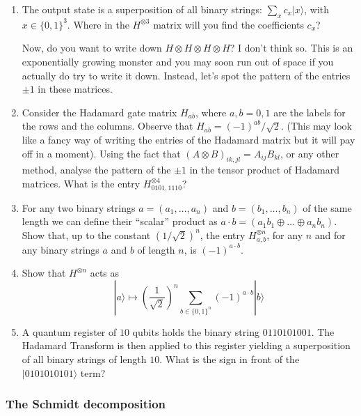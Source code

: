 \documentclass[fleqn]{article}
\begin{document}
\begin{enumerate}
\def\labelenumi{\arabic{enumi}.}
\setcounter{enumi}{2}
\item
  The output state is a superposition of all binary strings: \(\sum_x c_x|x\rangle\), with \(x\in\{0,1\}^3\).
  Where in the \(H^{\otimes 3}\) matrix will you find the coefficients \(c_x\)?

  Now, do you want to write down \(H\otimes H\otimes H\otimes H\)?
  I don't think so.
  This is an exponentially growing monster and you may soon run out of space if you actually do try to write it down.
  Instead, let's spot the pattern of the entries \(\pm1\) in these matrices.
\item
  Consider the Hadamard gate matrix \(H_{ab}\), where \(a,b=0,1\) are the labels for the rows and the columns.
  Observe that \(H_{ab}=(-1)^{ab}/\sqrt{2}\).
  (This may look like a fancy way of writing the entries of the Hadamard matrix but it will pay off in a moment).
  Using the fact that \((A\otimes B)_{ik,jl} = A_{ij}B_{kl}\), or any other method, analyse the pattern of the \(\pm1\) in the tensor product of Hadamard matrices.
  What is the entry \(H^{\otimes 4}_{0101,1110}\)?
\item
  For any two binary strings \(a=(a_1,\ldots, a_n)\) and \(b =(b_1,\ldots , b_n)\) of the same length we can define their ``scalar'' product as \(a\cdot b = (a_1b_1\oplus \ldots \oplus a_n b_n)\).
  Show that, up to the constant \((1/\sqrt{2})^n\), the entry \(H^{\otimes n}_{a,b}\), for any \(n\) and for any binary strings \(a\) and \(b\) of length \(n\), is \((-1)^{a\cdot b}\).
\item
  Show that \(H^{\otimes n}\) acts as
  \[
     |a\rangle
     \longmapsto
     \left(\frac{1}{\sqrt 2}\right)^n
     \sum_{b\in\{0,1\}^n} (-1)^{a\cdot b}|b\rangle
   \]
\item
  A quantum register of \(10\) qubits holds the binary string \(0110101001\).
  The Hadamard Transform is then applied to this register yielding a superposition of all binary strings of length \(10\).
  What is the sign in front of the \(|0101010101\rangle\) term?
\end{enumerate}

\hypertarget{the-schmidt-decomposition}{%
\subsubsection{The Schmidt decomposition}\label{the-schmidt-decomposition}}
\end{document}
